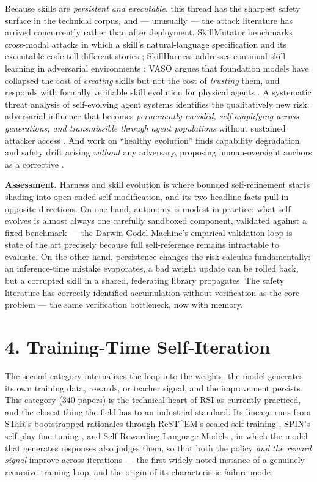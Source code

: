 \documentclass[
  11pt,
]{article}
\begin{document}
Because skills are \emph{persistent and executable}, this thread has the
sharpest safety surface in the technical corpus, and --- unusually ---
the attack literature has arrived concurrently rather than after
deployment. SkillMutator benchmarks cross-modal attacks in which a
skill's natural-language specification and its executable code tell
different stories \citep{kim2026skillmutator}; SkillHarness addresses
continual skill learning in adversarial environments
\citep{chen2026skillharness}; VASO argues that foundation models have
collapsed the cost of \emph{creating} skills but not the cost of
\emph{trusting} them, and responds with formally verifiable skill
evolution for physical agents \citep{yang2026vaso}. A systematic threat
analysis of self-evolving agent systems identifies the qualitatively new
risk: adversarial influence that becomes \emph{permanently encoded,
self-amplifying across generations, and transmissible through agent
populations} without sustained attacker access \citep{lin2026safety}.
And work on ``healthy evolution'' finds capability degradation and
safety drift arising \emph{without} any adversary, proposing
human-oversight anchors as a corrective \citep{shi2026healthy}.

\textbf{Assessment.} Harness and skill evolution is where bounded
self-refinement starts shading into open-ended self-modification, and
its two headline facts pull in opposite directions. On one hand,
autonomy is modest in practice: what self-evolves is almost always one
carefully sandboxed component, validated against a fixed benchmark ---
the Darwin Gödel Machine's empirical validation loop is state of the art
precisely because full self-reference remains intractable to evaluate.
On the other hand, persistence changes the risk calculus fundamentally:
an inference-time mistake evaporates, a bad weight update can be rolled
back, but a corrupted skill in a shared, federating library propagates.
The safety literature has correctly identified
accumulation-without-verification as the core problem --- the same
verification bottleneck, now with memory.

\section{4. Training-Time
Self-Iteration}\label{training-time-self-iteration}

The second category internalizes the loop into the weights: the model
generates its own training data, rewards, or teacher signal, and the
improvement persists. This category (340 papers) is the technical heart
of RSI as currently practiced, and the closest thing the field has to an
industrial standard. Its lineage runs from STaR's bootstrapped
rationales \citep{zelikman2022star} through ReST\^{}EM's scaled
self-training \citep{singh2023restem}, SPIN's self-play fine-tuning
\citep{chen2024spin}, and Self-Rewarding Language Models
\citep{yuan2024selfrewarding}, in which the model that generates
responses also judges them, so that both the policy \emph{and the reward
signal} improve across iterations --- the first widely-noted instance of
a genuinely recursive training loop, and the origin of its
characteristic failure mode.
\end{document}
